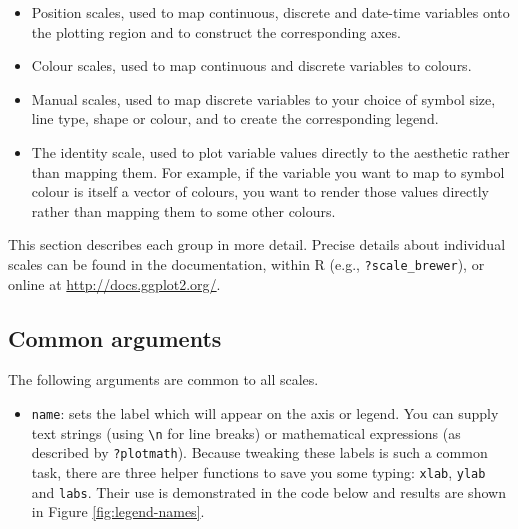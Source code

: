 \begin{itemize}
\itemsep1pt\parskip0pt
\item
  Position scales, used to map continuous, discrete and date-time
  variables onto the plotting region and to construct the corresponding
  axes.
\item
  Colour scales, used to map continuous and discrete variables to
  colours.
\item
  Manual scales, used to map discrete variables to your choice of symbol
  size, line type, shape or colour, and to create the corresponding
  legend.
\item
  The identity scale, used to plot variable values directly to the
  aesthetic rather than mapping them. For example, if the variable you
  want to map to symbol colour is itself a vector of colours, you want
  to render those values directly rather than mapping them to some other
  colours.
\end{itemize}

This section describes each group in more detail. Precise details about
individual scales can be found in the documentation, within R (e.g.,
\texttt{?scale\_brewer}), or online at \url{http://docs.ggplot2.org/}.

\subsection{Common arguments}\label{sub:scale-arguments}

The following arguments are common to all scales.

\begin{itemize}
\itemsep1pt\parskip0pt
\item
  \texttt{name}: sets the label which will appear on the axis or legend.
  You can supply text strings (using \texttt{\textbackslash{}n} for line
  breaks) or mathematical expressions (as described by
  \texttt{?plotmath}). Because tweaking these labels is such a common
  task, there are three helper functions to save you some typing:
  \texttt{xlab}, \texttt{ylab} and \texttt{labs}. Their use is
  demonstrated in the code below and results are shown in Figure
  \ref{fig:legend-names}.  
\end{itemize}


